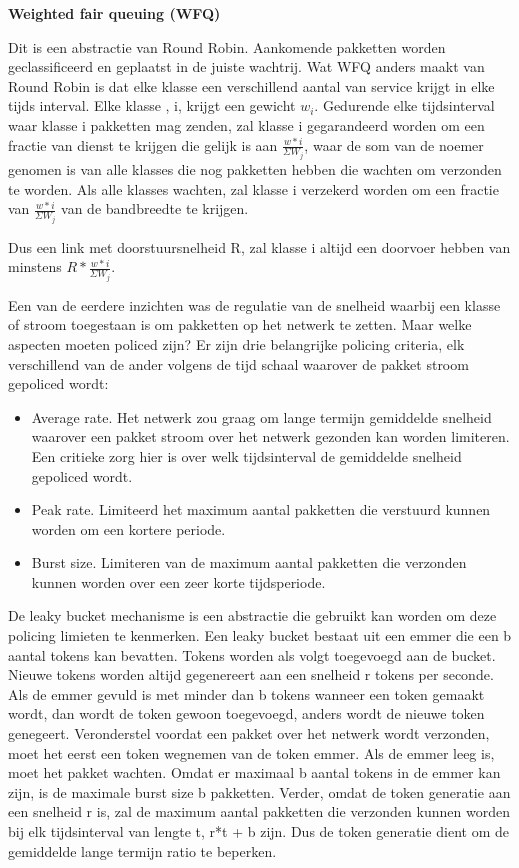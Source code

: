 \noindent \textbf{Weighted fair queuing (WFQ)}

\noindent Dit is een abstractie van Round Robin. Aankomende pakketten worden geclassificeerd en geplaatst in de juiste wachtrij. Wat WFQ anders maakt van Round Robin is dat elke klasse een verschillend aantal van service krijgt in elke tijds interval. Elke klasse , i, krijgt een gewicht $w_i$. Gedurende elke tijdsinterval waar klasse i pakketten mag zenden, zal klasse i gegarandeerd worden om een fractie van dienst te krijgen die gelijk is aan $\frac{w*i}{\Sigma W_j}$, waar de som van de noemer genomen is van alle klasses die nog pakketten hebben die wachten om verzonden te worden. Als alle klasses wachten, zal klasse i verzekerd worden om een fractie van $\frac{w*i}{\Sigma W_j}$ van de bandbreedte te krijgen.

\noindent Dus een link met doorstuursnelheid R, zal klasse i altijd een doorvoer hebben van minstens $R * \frac{w*i}{\Sigma W_j}$.


Een van de eerdere inzichten was de regulatie van de snelheid waarbij een klasse of stroom toegestaan is om pakketten op het netwerk te zetten. Maar welke aspecten moeten policed zijn? Er zijn drie belangrijke policing criteria, elk verschillend van de ander volgens de tijd schaal waarover de pakket stroom gepoliced wordt:

\begin{itemize}
\item 	Average rate. Het netwerk zou graag om lange termijn gemiddelde snelheid waarover een pakket stroom over het netwerk gezonden kan worden limiteren. Een critieke zorg hier is over welk tijdsinterval de gemiddelde snelheid gepoliced wordt.
\item 	Peak rate. Limiteerd het maximum aantal pakketten die verstuurd kunnen worden om een kortere periode.
\item 	Burst size. Limiteren van de maximum aantal pakketten die verzonden kunnen worden over een zeer korte tijdsperiode.
\end{itemize}

\noindent De leaky bucket mechanisme is een abstractie die gebruikt kan worden om deze policing limieten te kenmerken. Een leaky bucket bestaat uit een emmer die een b aantal tokens kan bevatten. Tokens worden als volgt toegevoegd aan de bucket. Nieuwe tokens worden altijd gegenereert aan een snelheid r tokens per seconde. Als de emmer gevuld is met minder dan b tokens wanneer een token gemaakt wordt, dan wordt de token gewoon toegevoegd, anders wordt de nieuwe token genegeert.
Veronderstel voordat een pakket over het netwerk wordt verzonden, moet het eerst een token wegnemen van de token emmer. Als de emmer leeg is, moet het pakket wachten.
Omdat er maximaal b aantal tokens in de emmer kan zijn, is de maximale burst size b pakketten. Verder, omdat de token generatie aan een snelheid r is, zal de maximum aantal pakketten die verzonden kunnen worden bij elk tijdsinterval van lengte t, r*t + b zijn. Dus de token generatie dient om de gemiddelde lange termijn ratio te beperken.

